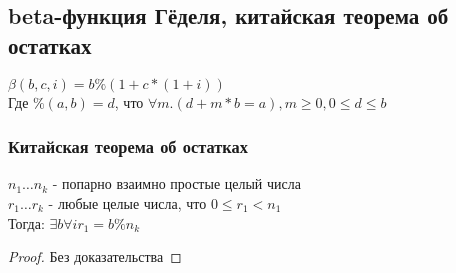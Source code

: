 \subsection{beta-функция Гёделя, китайская теорема об остатках}
\label{sec-11-3}
$\beta(b, c, i) = b \% (1 + c * (1 + i))$\\
Где $\%(a, b) = d$, что $\forall m . (d + m * b = a), m \geq 0, 0 \leq d \leq b$

\subsubsection{Китайская теорема об остатках}
\label{sec-11-3-1}
\begin{theorem}
$n_1\ldots{}n_k$ - попарно взаимно простые целый числа\\
$r_1\ldots{}r_k$ - любые целые числа, что $0 \leq r_1 < n_1$\\
Тогда: $\exists b \forall i  r_1 = b \% n_k$
\end{theorem}
\begin{proof}
Без доказательства
\end{proof}

